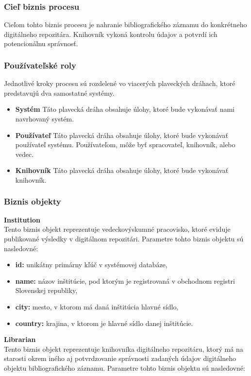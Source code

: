 \documentclass[10pt,oneside,slovak,a4paper]{article}
\begin{document}
\subsubsection{Cieľ biznis procesu}
Cieľom tohto biznis procesu je nahranie bibliografického záznamu do konkrétneho digitálneho repozitára. Knihovník vykoná kontrolu údajov a potvrdí ich potencionálnu správnosť.

\subsubsection{Používateľské roly}
Jednotlivé kroky procesu sú rozdelené vo viacerých plaveckých dráhach, ktoré predstavujú dva samostatné systémy.

\begin{itemize}
\item \textbf{Systém} Táto plavecká dráha obsahuje úlohy, ktoré bude vykonávať nami navrhovaný systém.
\item \textbf{Používateľ} Táto plavecká dráha obsahuje úlohy, ktoré bude vykonávať používateľ systému. Používateľom, môže byť spracovateľ, knihovník, alebo vedec.
\item \textbf{Knihovník} Táto plavecká dráha obsahuje úlohy, ktoré bude vykonávať knihovník.
\end{itemize}

\newpage

\subsubsection{Biznis objekty}
\textbf{Institution}\\
Tento biznis objekt reprezentuje vedeckovýskumné pracovisko, ktoré eviduje publikované výsledky v digitálnom repozitári. Parametre tohto biznis objektu sú nasledovné:

\begin{itemize}
\item \textbf{id:} unikátny primárny kľúč v systémovej databáze,
\item \textbf{name:} názov inštitúcie, pod ktorým je registrovaná v obchodnom registri Slovenskej republiky,
\item \textbf{city:} mesto, v ktorom má daná inštitúcia hlavné sídlo,
\item \textbf{country:} krajina, v ktorom je hlavné sídlo danej inštitúcie.
\end{itemize}

\textbf{Librarian}\\
Tento biznis objekt reprezentuje knihovníka digitálneho repozitáru, ktorý má na starosti okrem iného aj potvrdzovanie správnosti zadaných údajov digitálneho objektu bibliografického záznamu. Parametre tohto biznis objektu sú nasledovné:
\end{document}
